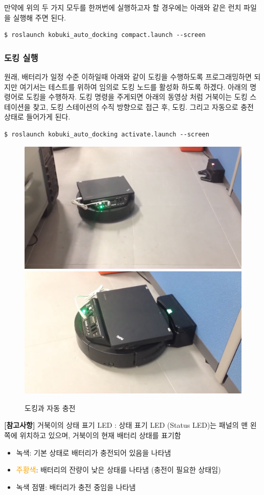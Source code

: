 만약에 위의 두 가지 모두를 한꺼번에 실행하고자 할 경우에는 아래와 같은 런치 파일을 실행해 주면 된다.

\vspace{\baselineskip}
\begin{lstlisting}[language=ROS]
$ roslaunch kobuki_auto_docking compact.launch --screen
\end{lstlisting} 

\subsubsection{도킹 실행}

원래, 배터리가 일정 수준 이하일때 아래와 같이 도킹을 수행하도록 프로그래밍하면 되지만 여기서는 테스트를 위하여 임의로 도킹 노드를 활성화 하도록 하겠다. 아래의 명령어로 도킹을 수행하자. 도킹 명령을 주게되면 아래의 동영상 처럼 거북이는 도킹 스테이션을 찾고, 도킹 스테이션의 수직 방향으로 접근 후, 도킹. 그리고 자동으로 충전 상태로 들어가게 된다.

\vspace{\baselineskip}
\begin{lstlisting}[language=ROS]
$ roslaunch kobuki_auto_docking activate.launch --screen
\end{lstlisting}

\begin{figure}[h]
\centering
\includegraphics[width=0.45\columnwidth]{pictures/chapter10/kobuki_docking1.png}
\includegraphics[width=0.45\columnwidth]{pictures/chapter10/kobuki_docking2.png}
\caption{도킹과 자동 충전}
\end{figure}


\vspace{\baselineskip}
\textbf{[참고사항]} 거북이의 상태 표기 LED : 상태 표기 LED (Status LED)는 패널의 맨 왼쪽에 위치하고 있으며, 거북이의 현재 배터리 상태를 표기함
\begin{itemize}[leftmargin=*]
\item {\color{limegreen}녹색}: 기본 상태로 배터리가 충전되어 있음을 나타냄
\item \textcolor{orange}{주황색}: 배터리의 잔량이 낮은 상태를 나타냄 (충전이 필요한 상태임)
\item {\color{limegreen}녹색 점멸}: 배터리가 충전 중임을 나타냄
\end{itemize}

